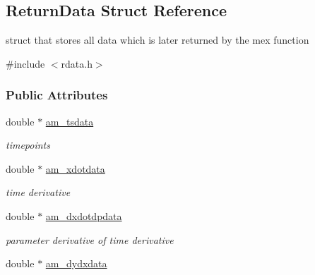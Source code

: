 \hypertarget{struct_return_data}{}\subsection{Return\+Data Struct Reference}
\label{struct_return_data}


struct that stores all data which is later returned by the mex function  




{\ttfamily \#include $<$rdata.\+h$>$}

\subsubsection*{Public Attributes}
\begin{DoxyCompactItemize}
\item 
\hypertarget{struct_return_data_a577298549da7c9dbe3d93fbf3bc17866}{}double $\ast$ \hyperlink{struct_return_data_a577298549da7c9dbe3d93fbf3bc17866}{am\+\_\+tsdata}\label{struct_return_data_a577298549da7c9dbe3d93fbf3bc17866}

\begin{DoxyCompactList}\small\item\em timepoints \end{DoxyCompactList}\item 
\hypertarget{struct_return_data_a3ea8fa08fcced0827c1df276b0d253c8}{}double $\ast$ \hyperlink{struct_return_data_a3ea8fa08fcced0827c1df276b0d253c8}{am\+\_\+xdotdata}\label{struct_return_data_a3ea8fa08fcced0827c1df276b0d253c8}

\begin{DoxyCompactList}\small\item\em time derivative \end{DoxyCompactList}\item 
\hypertarget{struct_return_data_a494b13e9797d95d7fb3c89e09864aa4f}{}double $\ast$ \hyperlink{struct_return_data_a494b13e9797d95d7fb3c89e09864aa4f}{am\+\_\+dxdotdpdata}\label{struct_return_data_a494b13e9797d95d7fb3c89e09864aa4f}

\begin{DoxyCompactList}\small\item\em parameter derivative of time derivative \end{DoxyCompactList}\item 
\hypertarget{struct_return_data_a831cada35b4f407a2c8ad789dfc534e5}{}double $\ast$ \hyperlink{struct_return_data_a831cada35b4f407a2c8ad789dfc534e5}{am\+\_\+dydxdata}\label{struct_return_data_a831cada35b4f407a2c8ad789dfc534e5}


\end{DoxyCompactItemize}
